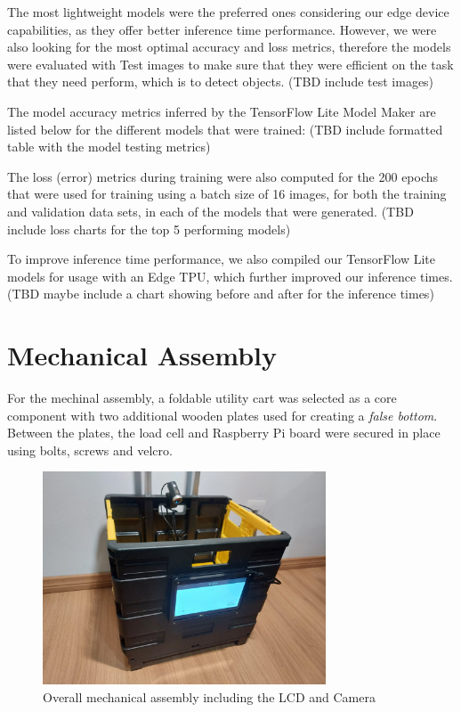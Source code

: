 \documentclass[openright]{normas-utf-tex} %
\begin{document}
The most lightweight models were the preferred ones considering our edge device capabilities,
as they offer better inference time performance. 
However, we were also looking for the most optimal accuracy and loss metrics, 
therefore the models were evaluated with Test images to make sure that they were 
efficient on the task that they need perform, which is to detect objects.
(TBD include test images)

The model accuracy metrics inferred by the TensorFlow Lite Model Maker are listed below for the
different models that were trained:
(TBD include formatted table with the model testing metrics)

The loss (error) metrics during training were also computed for the 200 epochs that were used for
training using a batch size of 16 images, for both the training and validation data sets, 
in each of the models that were generated.
(TBD include loss charts for the top 5 performing models)

To improve inference time performance, we also compiled our TensorFlow Lite models for usage with an
Edge TPU, which further improved our inference times. 
(TBD maybe include a chart showing before and after for the inference times)

\section{Mechanical Assembly}

For the mechinal assembly, a foldable utility cart was selected as a core
component with two additional wooden plates used for creating a \textit{false
bottom}. Between the plates, the load cell and Raspberry Pi board were secured
in place using bolts, screws and velcro.

\begin{figure}[H]
	\centering
	\includegraphics[width=0.75\textwidth]{./images/cart.jpeg}
	\caption[Overall mechanical assembly including the LCD and Camera]{Overall mechanical assembly including the LCD and Camera}
\end{figure}
\end{document}
